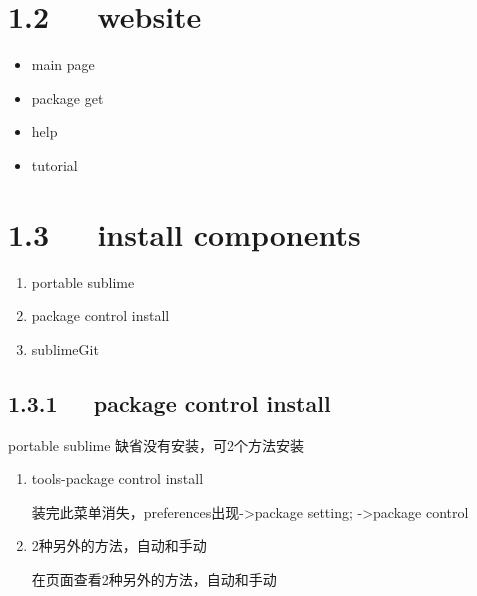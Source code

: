 \documentclass[letterpaper,12pt,english]{sphinxmanual}
\begin{document}
\section{1.2   website}
\label{\detokenize{001software/001install/sublime:website}}\begin{itemize}
\item {} 
main page

\item {} 
package get

\item {} 
help

\item {} 
tutorial

\end{itemize}


\section{1.3   install components}
\label{\detokenize{001software/001install/sublime:install-components}}\begin{enumerate}
%
\item {} 
portable sublime

\item {} 
package control install

\item {} 
sublimeGit

\end{enumerate}


\subsection{1.3.1   package control install}
\label{\detokenize{001software/001install/sublime:package-control-install}}
portable sublime 缺省没有安装，可2个方法安装
\begin{enumerate}
%
\item {} 
tools-package control install

装完此菜单消失，preferences出现-\textgreater{}package setting; -\textgreater{}package control

\item {} 
2种另外的方法，自动和手动

在页面查看2种另外的方法，自动和手动

\end{enumerate}
\end{document}

